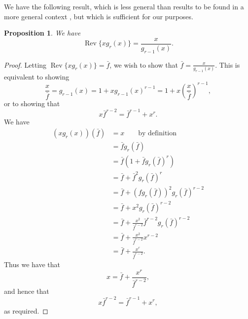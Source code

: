 \documentclass[12pt,reqno]{article}
\newtheorem{proposition}[theorem]{Proposition}
\theoremstyle{definition}
\DeclareMathOperator{\Rev}{Rev}
\begin{document}
We have the following result, which is less general than results to be found in  a more general context \cite{Yang}, but which is sufficient for our purposes.
\begin{proposition} We have
$$\Rev\{x g_r(x)\}=\frac{x}{g_{r-1}(x)}.$$
\end{proposition}
\begin{proof} Letting $\Rev\{x g_r(x)\}=\bar{f}$, we wish to show that $\bar{f}=\frac{x}{g_{r-1}(x)}$. This is equivalent to showing
$$\frac{x}{\bar{f}}=g_{r-1}(x)=1+x g_{r-1}(x)^{r-1}=1+x \left(\frac{x}{\bar{f}}\right)^{r-1},$$
or to showing that
$$x {\bar{f}}^{r-2}={\bar{f}}^{r-1}+x^r.$$
We have
\begin{align*}
(xg_r(x))(\bar{f})&=x\quad\quad\text{by definition}\\
&=\bar{f}g_r(\bar{f})\\
&=\bar{f}(1+\bar{f}g_r(\bar{f})^r)\\
&=\bar{f}+{\bar{f}}^2 g_r(\bar{f})^r\\
&=\bar{f}+(f g_r(\bar{f}))^2 g_r(\bar{f})^{r-2}\\
&=\bar{f}+x^2 g_r(\bar{f})^{r-2}\\
&=\bar{f}+\frac{x^2}{{\bar{f}}^{r-2}} {\bar{f}}^{r-2}g_r(\bar{f})^{r-2}\\
&=\bar{f}+\frac{x^2}{{\bar{f}}^{r-2}} x^{r-2}\\
&=\bar{f}+\frac{x^r}{{\bar{f}}^{r-2}}.\end{align*}
Thus we have that
$$x=\bar{f}+\frac{x^r}{{\bar{f}}^{r-2}},$$ and hence that
$$x {\bar{f}}^{r-2}={\bar{f}}^{r-1}+x^r,$$ as required.
\end{proof}
\end{document}

